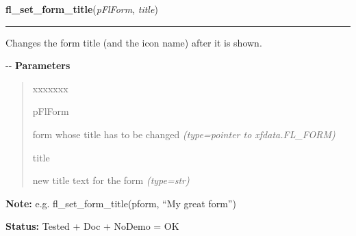 \hspace{.8\funcindent}\begin{boxedminipage}{\funcwidth}

    \raggedright \textbf{fl\_set\_form\_title}(\textit{pFlForm}, \textit{title})

    \vspace{-1.5ex}

    \rule{\textwidth}{0.5\fboxrule}
\setlength{\parskip}{2ex}

Changes the form title (and the icon name) after it is shown.

-{}-
\setlength{\parskip}{1ex}
      \textbf{Parameters}
      \vspace{-1ex}

      \begin{quote}
        \begin{Ventry}{xxxxxxx}

          \item[pFlForm]


form whose title has to be changed
            {\it (type=pointer to xfdata.FL\_FORM)}

          \item[title]


new title text for the form
            {\it (type=str)}

        \end{Ventry}

      \end{quote}

\textbf{Note:} 
e.g. fl\_set\_form\_title(pform, ``My great form'')


\textbf{Status:} 
Tested + Doc + NoDemo = OK


    \end{boxedminipage}

    \label{xformslib:flbasic:fl_set_app_mainform}

    \vspace{0.5ex}

